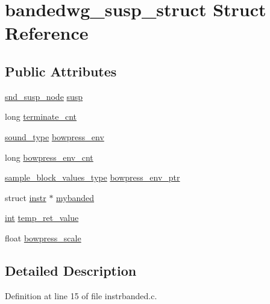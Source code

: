 \hypertarget{structbandedwg__susp__struct}{}\section{bandedwg\+\_\+susp\+\_\+struct Struct Reference}
\label{structbandedwg__susp__struct}
\subsection*{Public Attributes}
\begin{DoxyCompactItemize}
\item 
\hyperlink{sound_8h_a6b268203688a934bd798ceb55f85d4c0}{snd\+\_\+susp\+\_\+node} \hyperlink{structbandedwg__susp__struct_a896df620d872d23682bc90192a0bca48}{susp}
\item 
long \hyperlink{structbandedwg__susp__struct_a06a5e64eb8b6d0ba7f9210c92f70dcbe}{terminate\+\_\+cnt}
\item 
\hyperlink{sound_8h_a792cec4ed9d6d636d342d9365ba265ea}{sound\+\_\+type} \hyperlink{structbandedwg__susp__struct_a2d6d52b9e60ee2f13e01692490cacc96}{bowpress\+\_\+env}
\item 
long \hyperlink{structbandedwg__susp__struct_a5184b2d7af2a32fcca32b241b9931133}{bowpress\+\_\+env\+\_\+cnt}
\item 
\hyperlink{sound_8h_a83d17f7b465d1591f27cd28fc5eb8a03}{sample\+\_\+block\+\_\+values\+\_\+type} \hyperlink{structbandedwg__susp__struct_a7c9b847439106692759bf2e770166f4b}{bowpress\+\_\+env\+\_\+ptr}
\item 
struct \hyperlink{structinstr}{instr} $\ast$ \hyperlink{structbandedwg__susp__struct_ac642b5c2c0b8d64f10f712c720cc5293}{mybanded}
\item 
\hyperlink{xmltok_8h_a5a0d4a5641ce434f1d23533f2b2e6653}{int} \hyperlink{structbandedwg__susp__struct_ac5201254e6978ac2942cef886bb0586c}{temp\+\_\+ret\+\_\+value}
\item 
float \hyperlink{structbandedwg__susp__struct_a3d7289bacdaad65fff599d14c8ea2eb9}{bowpress\+\_\+scale}
\end{DoxyCompactItemize}


\subsection{Detailed Description}


Definition at line 15 of file instrbanded.\+c.




